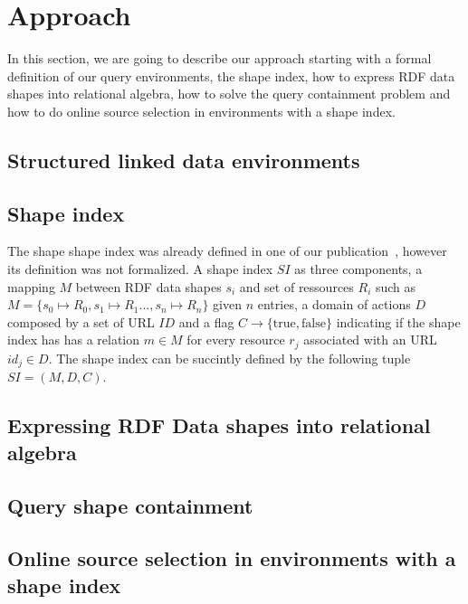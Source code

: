 \section{Approach}

In this section, we are going to describe our approach starting with a formal definition of our query environments,
the shape index, how to express RDF data shapes into relational algebra, how to solve the query containment problem
and how to do online source selection in environments with a shape index.

\subsection{Structured linked data environments}

\subsection{Shape index}
The shape shape index was already defined in one of our publication~\cite{tam2024opportunitiesshapebasedoptimizationlink}, however its definition was not formalized.
A shape index $SI$ as three components, a mapping $M$ between RDF data shapes $s_i$ and set of ressources $R_i$ such as $M = \{s_0 \mapsto R_0, s_1 \mapsto R_1..., s_n \mapsto R_n\}$ given $n$ entries,
a domain of actions $D$ composed by a set of URL $ID$ and
a flag $C\rightarrow \{\mathrm{true}, \mathrm{false}\}$ indicating if the shape index has has a relation $m \in M$ for every resource $r_j$ associated with an URL $id_j \in D$. 
The shape index can be succintly defined by the following tuple $SI = (M, D, C)$.

\subsection{Expressing RDF Data shapes into relational algebra}

\subsection{Query shape containment}

\subsection{Online source selection in environments with a shape index}